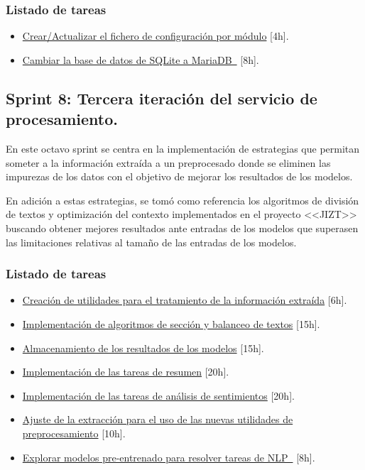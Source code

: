 \subsubsection{Listado de tareas}

\begin{itemize} \setlength\itemsep{0.2em}
    \item \href{https://github.com/MrpYA45/github-text-mining-tfg/issues/27}{Crear/Actualizar el fichero de configuración por módulo} [4h].
    \item \href{https://github.com/MrpYA45/github-text-mining-tfg/issues/26}{Cambiar la base de datos de SQLite a MariaDB } [8h].
\end{itemize}

\subsection{Sprint 8: Tercera iteración del servicio de procesamiento.}

En este octavo sprint se centra en la implementación de estrategias que permitan someter a la información extraída a un preprocesado donde se eliminen las impurezas de los datos con el objetivo de mejorar los resultados de los modelos.

En adición a estas estrategias, se tomó como referencia los algoritmos de división de textos y optimización del contexto implementados en el proyecto <<JIZT>> buscando obtener mejores resultados ante entradas de los modelos que superasen las limitaciones relativas al tamaño de las entradas de los modelos.

\subsubsection{Listado de tareas}

\begin{itemize} \setlength\itemsep{0.2em}
    \item \href{https://github.com/MrpYA45/github-text-mining-tfg/issues/29}{Creación de utilidades para el tratamiento de la información extraída} [6h].
    \item \href{https://github.com/MrpYA45/github-text-mining-tfg/issues/30}{Implementación de algoritmos de sección y balanceo de textos} [15h].
    \item \href{https://github.com/MrpYA45/github-text-mining-tfg/issues/34}{Almacenamiento de los resultados de los modelos} [15h].
    \item \href{https://github.com/MrpYA45/github-text-mining-tfg/issues/31}{Implementación de las tareas de resumen} [20h].
    \item \href{https://github.com/MrpYA45/github-text-mining-tfg/issues/32}{Implementación de las tareas de análisis de sentimientos} [20h].
    \item \href{https://github.com/MrpYA45/github-text-mining-tfg/issues/33}{Ajuste de la extracción para el uso de las nuevas utilidades de preprocesamiento} [10h].
    \item \href{https://github.com/MrpYA45/github-text-mining-tfg/issues/5}{Explorar modelos pre-entrenado para resolver tareas de NLP } [8h].
\end{itemize}

